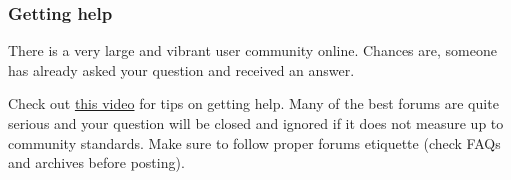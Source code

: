 \documentclass[11pt,ignorenonframetext,]{beamer}
\begin{document}
\begin{frame}\frametitle{Getting help}

There is a very large and vibrant user community online. Chances are,
someone has already asked your question and received an answer.

Check out \href{http://youtu.be/ZFaWxxzouCY}{this video} for tips on
getting help. Many of the best forums are quite serious and your
question will be closed and ignored if it does not measure up to
community standards. Make sure to follow proper forums etiquette (check
FAQs and archives before posting).

\end{frame}
\end{document}
